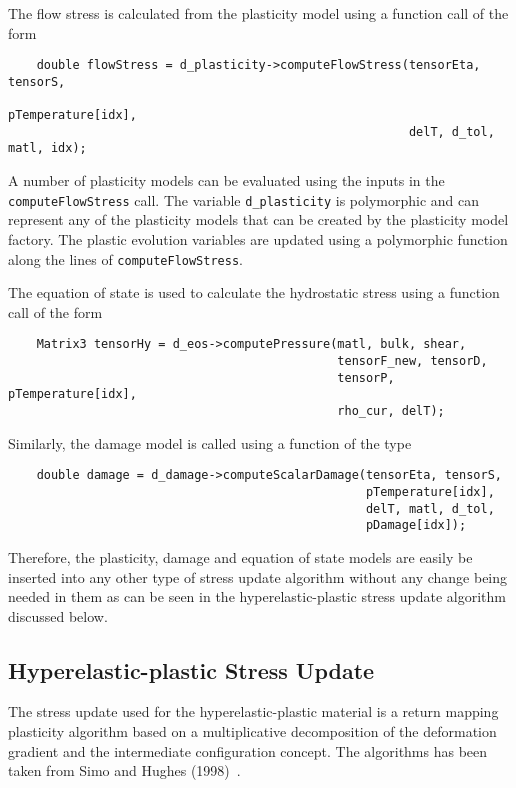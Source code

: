\documentclass[10pt]{article}
\begin{document}
  The flow stress is calculated from the plasticity model using a 
  function call of the form
  \begin{verbatim}
    double flowStress = d_plasticity->computeFlowStress(tensorEta, tensorS, 
                                                        pTemperature[idx],
                                                        delT, d_tol, matl, idx);
  \end{verbatim}
  A number of plasticity models can be evaluated using the inputs in the
  \verb+computeFlowStress+ call.  The variable \verb+d_plasticity+ is
  polymorphic and can represent any of the plasticity models that can be
  created by the plasticity model factory.  The plastic evolution variables
  are updated using a polymorphic function along the lines of
   \verb+computeFlowStress+.

  The equation of state is used to calculate the hydrostatic stress using
  a function call of the form
  \begin{verbatim}
    Matrix3 tensorHy = d_eos->computePressure(matl, bulk, shear, 
                                              tensorF_new, tensorD, 
                                              tensorP, pTemperature[idx], 
                                              rho_cur, delT);
  \end{verbatim}

  Similarly, the damage model is called using a function of the type
  \begin{verbatim}
    double damage = d_damage->computeScalarDamage(tensorEta, tensorS, 
                                                  pTemperature[idx],
                                                  delT, matl, d_tol, 
                                                  pDamage[idx]);
  \end{verbatim}

  Therefore, the plasticity, damage and equation of state models are 
  easily be inserted into any other type of stress update algorithm 
  without any change being needed in them as can be seen in the 
  hyperelastic-plastic stress update algorithm discussed below.

  \subsection{Hyperelastic-plastic Stress Update}
  The stress update used for the hyperelastic-plastic material is
  a return mapping plasticity algorithm based on a multiplicative 
  decomposition of the deformation gradient and the intermediate
  configuration concept.  The algorithms has been taken from
  Simo and Hughes (1998)~\cite{Simo1998}.
\end{document}
